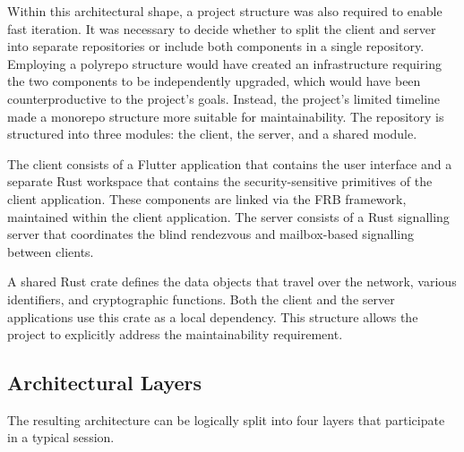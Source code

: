 \documentclass[12pt,a4paper,oneside]{report}
\begin{document}
Within this architectural shape, a project structure was also required to enable fast iteration. It was necessary to decide whether to split the client and server into separate repositories or include both components in a single repository. Employing a polyrepo structure would have created an infrastructure requiring the two components to be independently upgraded, which would have been counterproductive to the project's goals. Instead, the project's limited timeline made a monorepo structure more suitable for maintainability. The repository is structured into three modules: the client, the server, and a shared module.

The client consists of a Flutter application that contains the user interface and a separate Rust workspace that contains the security-sensitive primitives of the client application. These components are linked via the FRB framework, maintained within the client application. The server consists of a Rust signalling server that coordinates the blind rendezvous and mailbox-based signalling between clients.

A shared Rust crate defines the data objects that travel over the network, various identifiers, and cryptographic functions. Both the client and the server applications use this crate as a local dependency. This structure allows the project to explicitly address the maintainability requirement.


\subsection{Architectural Layers}
\label{sec:arch-layers}

The resulting architecture can be logically split into four layers that participate in a typical session.
\end{document}
